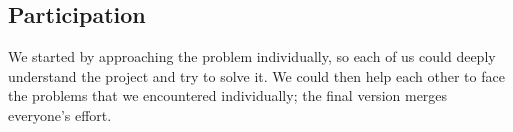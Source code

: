 \documentclass[a4paper, 11pt]{article}
\begin{document}
\subsection*{Participation}
We started by approaching the problem individually, so each of us could deeply understand the project and try to solve it. We could then help each other to face the problems that we encountered individually; the final version merges everyone's effort.
\end{document}
